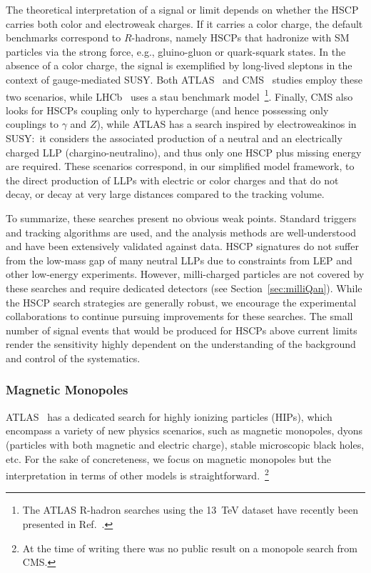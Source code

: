 The theoretical interpretation of a signal or limit depends on whether the HSCP carries both color and electroweak charges. If it carries a color charge, the default benchmarks correspond to $R$-hadrons, namely HSCPs that hadronize with SM particles via the strong force, e.g., gluino-gluon or quark-squark states. In the absence of a color charge, the signal is exemplified by long-lived sleptons in the context of gauge-mediated SUSY. Both ATLAS~\cite{ATLAS:2014fka} and CMS~\cite{CMS-PAS-EXO-16-036} studies employ these two scenarios, while LHCb~\cite{Aaij:2015ica} uses a stau benchmark model~\footnote{The ATLAS R-hadron searches using the 13~TeV dataset have recently been presented in Ref.~\cite{Aaboud:2019trc}. }.
Finally, CMS also looks for HSCPs coupling only to hypercharge (and hence possessing only couplings to $\gamma$ and $Z$), while ATLAS has a search inspired by electroweakinos in SUSY:~it considers the associated production of a neutral and an electrically charged LLP (chargino-neutralino), and thus only one HSCP plus missing energy are required. These scenarios correspond, in our simplified model framework, to the direct production of LLPs with electric or color charges and that do not decay, or decay at very large distances compared to the tracking volume.

To summarize, these searches present no obvious weak points. Standard triggers and tracking algorithms are used, and the analysis methods are well-understood and have been extensively validated against data. HSCP signatures do not suffer from the low-mass gap of many neutral LLPs due to constraints from LEP and other low-energy experiments. However, milli-charged particles are not covered by these searches and require dedicated detectors (see Section~\ref{sec:milliQan}). While the HSCP search strategies are generally robust, we encourage the experimental collaborations to continue pursuing improvements for these searches. The small number of signal events that would be produced for HSCPs above current limits render the sensitivity highly dependent on the understanding of the background and control of the systematics.

\subsubsection*{Magnetic Monopoles}

ATLAS~\cite{Aad:2015kta} has a dedicated search for highly ionizing particles (HIPs), which encompass a variety of new physics scenarios, such as magnetic monopoles, dyons (particles with both magnetic and electric charge), stable microscopic black holes, etc. For the sake of concreteness, we focus on magnetic monopoles but the interpretation in terms of other models is straightforward.~\footnote{At the time of writing there was no public result on a monopole search from CMS.}

